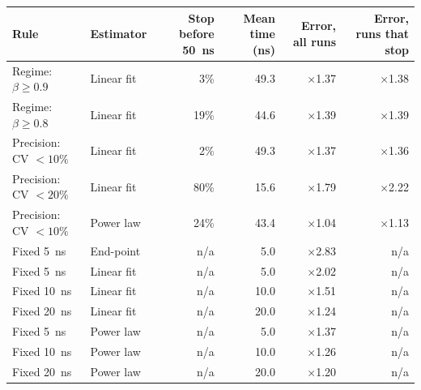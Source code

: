 \begin{tabular}{llrrrr}
\toprule
Rule & Estimator & Stop before \SI{50}{\nano\second} & Mean time (ns) & Error, all runs & Error, runs that stop \\
\midrule
Regime: $\beta\ge0.9$ & Linear fit & 3\% & 49.3 & $\times$1.37 & $\times$1.38 \\
Regime: $\beta\ge0.8$ & Linear fit & 19\% & 44.6 & $\times$1.39 & $\times$1.39 \\
Precision: CV $<10\%$ & Linear fit & 2\% & 49.3 & $\times$1.37 & $\times$1.36 \\
Precision: CV $<20\%$ & Linear fit & 80\% & 15.6 & $\times$1.79 & $\times$2.22 \\
Precision: CV $<10\%$ & Power law & 24\% & 43.4 & $\times$1.04 & $\times$1.13 \\
\midrule
Fixed \SI{5}{\nano\second} & End-point & n/a & 5.0 & $\times$2.83 & n/a \\
Fixed \SI{5}{\nano\second} & Linear fit & n/a & 5.0 & $\times$2.02 & n/a \\
Fixed \SI{10}{\nano\second} & Linear fit & n/a & 10.0 & $\times$1.51 & n/a \\
Fixed \SI{20}{\nano\second} & Linear fit & n/a & 20.0 & $\times$1.24 & n/a \\
Fixed \SI{5}{\nano\second} & Power law & n/a & 5.0 & $\times$1.37 & n/a \\
Fixed \SI{10}{\nano\second} & Power law & n/a & 10.0 & $\times$1.26 & n/a \\
Fixed \SI{20}{\nano\second} & Power law & n/a & 20.0 & $\times$1.20 & n/a \\
\bottomrule
\end{tabular}
